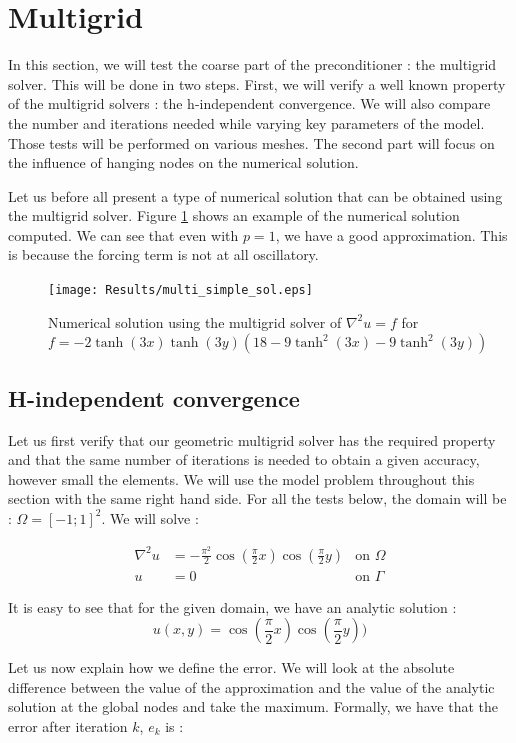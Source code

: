 \section{Multigrid}
In this section, we will test the coarse part of the preconditioner : the multigrid solver. This will be done in two steps. First, we will verify a well known property of the multigrid solvers : the h-independent convergence. We will also compare the number and iterations needed while varying key parameters of the model. Those tests will be performed on various meshes. The second part will focus on the influence of hanging nodes on the numerical solution. 

Let us before all present a type of numerical solution that can be obtained using the multigrid solver. Figure \ref{multi_simple_sol} shows an example of the numerical solution computed. We can see that even with $p=1$, we have a good approximation. This is because the forcing term is not at all oscillatory.

\begin{figure}
\centering
\texttt{[image: Results/multi\_simple\_sol.eps]}
\caption{Numerical solution using the multigrid solver of $\nabla^2 u = f$ for $f = -2\tanh(3x)\tanh(3y)(18-9\tanh^2(3x)-9\tanh^2(3y))$}
\label{multi_simple_sol}
\end{figure}

\subsection{H-independent convergence}
Let us first verify that our geometric multigrid solver has the required property and that the same number of iterations is needed to obtain a given accuracy, however small the elements. We will use the model problem throughout this section with the same right hand side. For all the tests below, the domain  will be : $\Omega = [-1;1]^2$. We will solve : 

\begin{align}
\nabla^2 u &= -\frac{\pi^2}{2}\cos(\frac{\pi}{2}x)\cos(\frac{\pi}{2}y) &\text{on $\Omega$} \\
u &= 0  &\text{on $\Gamma$}
\end{align}

It is easy to see that for the given domain, we have an analytic solution : 
$$u(x,y) = \cos(\frac{\pi}{2}x)\cos(\frac{\pi}{2}y))$$ 


Let us now explain how we define the error. We will look at the absolute difference between the value of the approximation and the value of the analytic solution at the global nodes and take the maximum. Formally, we have that the error after iteration $k$, $e_k$ is :


